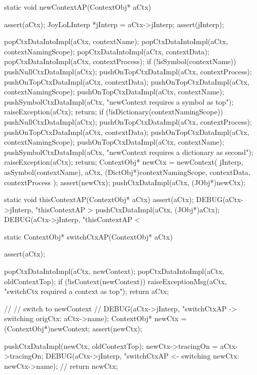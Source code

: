 \startCCode
static void newContextAP(ContextObj* aCtx) {
  assert(aCtx);
  JoyLoLInterp *jInterp = aCtx->jInterp;
  assert(jInterp);

  popCtxDataIntoImpl(aCtx, contextName);
  popCtxDataIntoImpl(aCtx, contextNamingScope);
  popCtxDataIntoImpl(aCtx, contextData);
  popCtxDataIntoImpl(aCtx, contextProcess);
  if (!isSymbol(contextName)) {
    pushNullCtxDataImpl(aCtx);
    pushOnTopCtxDataImpl(aCtx, contextProcess);
    pushOnTopCtxDataImpl(aCtx, contextData);
    pushOnTopCtxDataImpl(aCtx, contextNamingScope);
    pushOnTopCtxDataImpl(aCtx, contextName);
    pushSymbolCtxDataImpl(aCtx,
      "newContext requires a symbol as top");
    raiseException(aCtx);
    return;
  }
  if (!isDictionary(contextNamingScope)) {
    pushNullCtxDataImpl(aCtx);
    pushOnTopCtxDataImpl(aCtx, contextProcess);
    pushOnTopCtxDataImpl(aCtx, contextData);
    pushOnTopCtxDataImpl(aCtx, contextNamingScope);
    pushOnTopCtxDataImpl(aCtx, contextName);
    pushSymbolCtxDataImpl(aCtx,
      "newContext requires a dictionary as second");
    raiseException(aCtx);
    return;
  }
  ContextObj* newCtx = newContext(
    jInterp,
    asSymbol(contextName),
    aCtx,
    (DictObj*)contextNamingScope,
    contextData,
    contextProcess
  );
  assert(newCtx);
  pushCtxDataImpl(aCtx, (JObj*)newCtx);
}
\stopCCode

\startCCode
static void thisContextAP(ContextObj* aCtx) {
  assert(aCtx);
  DEBUG(aCtx->jInterp, "thisContextAP > %
  pushCtxDataImpl(aCtx, (JObj*)aCtx);
  DEBUG(aCtx->jInterp, "thisContextAP < %
}
\stopCCode

\startCCode
static ContextObj* switchCtxAP(ContextObj* aCtx) {
  assert(aCtx);

  popCtxDataIntoImpl(aCtx, newContext);
  popCtxDataIntoImpl(aCtx, oldContextTop);
  if (!isContext(newContext)) {
    raiseExceptionMsg(aCtx,
      "switchCtx required a context as top");
    return aCtx;
  }
  
  //
  // switch to newContext
  //
  DEBUG(aCtx->jInterp, "switchCtxAP -> switching origCtx: %
    aCtx->name);
  ContextObj* newCtx = (ContextObj*)newContext;
  assert(newCtx);

  pushCtxDataImpl(newCtx, oldContextTop);
  newCtx->tracingOn = aCtx->tracingOn;
  DEBUG(aCtx->jInterp, "switchCtxAP <- switching newCtx: %
            newCtx->name);
  //
  return newCtx;
}
\stopCCode

